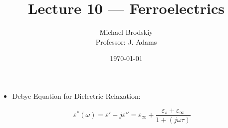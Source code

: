 


\title{Lecture 10 — Ferroelectrics}
\date{\today}
\author{Michael Brodskiy\\ \small Professor: J. Adams}



\maketitle

\begin{itemize}

  \item Debye Equation for Dielectric Relaxation:

    $$\varepsilon^*(\omega)=\varepsilon'-j\varepsilon''=\varepsilon_{\infty}+\frac{\varepsilon_s+\varepsilon_{\infty}}{1+(j\omega\tau)}$$

\end{itemize}



